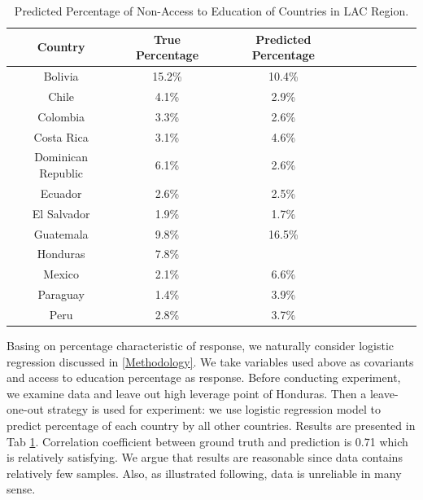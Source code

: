 \documentclass{article}
\begin{document}
\begin{table}[]
\setlength{\belowcaptionskip}{0.2cm}
\label{Tab:3}
\caption{Predicted Percentage of Non-Access to Education of Countries in LAC Region. }
\centering
\begin{tabular}{ccccccccc}
\hline
Country      & True Percentage & Predicted Percentage\\ \hline
Bolivia          & 15.2\%  & 10.4\%  \\ 
Chile          & 4.1\%  &2.9\%  \\
Colombia          & 3.3\%  &2.6\%  \\
Costa Rica          & 3.1\%  & 4.6\%  \\
Dominican Republic          & 6.1\% & 2.6\%   \\
Ecuador          & 2.6\%& 2.5\%   \\
El Salvador          & 1.9\% & 1.7\%   \\
Guatemala          & 9.8\%& 16.5\%    \\
Honduras          & 7.8\%    \\
Mexico          & 2.1\%  & 6.6\% \\
Paraguay          & 1.4\% &3.9\%   \\
Peru          & 2.8\% &3.7\%   \\
 \hline
\end{tabular}
\end{table}

Basing on percentage characteristic of response, we naturally consider logistic regression discussed in \ref{Methodology}. We take variables used above as covariants and access to education percentage as response. Before conducting experiment, we examine data and leave out high leverage point of Honduras. Then a leave-one-out strategy is used for experiment: we use logistic regression model to predict percentage of each country by all other countries. Results are presented in Tab \ref{Tab:3}. Correlation coefficient between ground truth and prediction is 0.71 which is relatively satisfying. We argue that results are reasonable since data contains relatively few samples. Also, as illustrated following, data is unreliable in many sense. 
\end{document}
